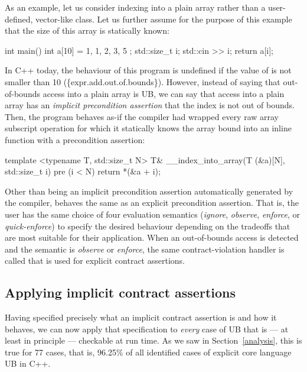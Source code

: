{As an example, let us consider indexing into a plain array rather than a user-defined, vector-like class. Let us further assume for the purpose of this example that the size  of this array is statically known:

\begin{codeblock}
int main() {
  int a[10] = { 1, 1, 2, 3, 5 };
  std::size_t i; 
  std::cin >> i;
  return a[i];
}
\end{codeblock}

In C++ today, the behaviour of this program is undefined if the value of  is not smaller than 10 (\{expr.add.out.of.bounds\}). However, instead of saying that out-of-bounds access into a plain array is UB, we can say that access into a plain array has an \emph{implicit precondition assertion} that the index is not out of bounds. Then, the program behaves as-if the compiler had wrapped every raw array subscript operation for which it statically knows the array bound  into an inline function with a precondition assertion:

\begin{codeblock}
template <typename T, std::size_t N>
T& __index_into_array(T (&a)[N], std::size_t i) 
pre (i < N) {
  return *(&a + i);
}
\end{codeblock}

Other than being an implicit precondition assertion automatically generated by the compiler, \mbox{} behaves the same as an explicit precondition assertion. That is, the user has the same choice of four evaluation semantics (\emph{ignore}, \emph{observe}, \emph{enforce}, or \emph{quick-enforce}) to specify the desired behaviour depending on the tradeoffs that are most suitable for their application. When an out-of-bounds access is detected and the semantic is \emph{observe} or \emph{enforce}, the same contract-violation handler is called that is used for explicit contract assertions.

\subsection{Applying implicit contract assertions}
\label{applyicas}

Having specified precisely what an implicit contract assertion is and how it behaves, we can now apply that specification to \emph{every} case of UB  that is --- at least in principle --- checkable at run time. As we saw in Section~\ref{analysis}, this is true for 77 cases, that is, 96.25\% of all identified cases of explicit core language UB in C++.

}
